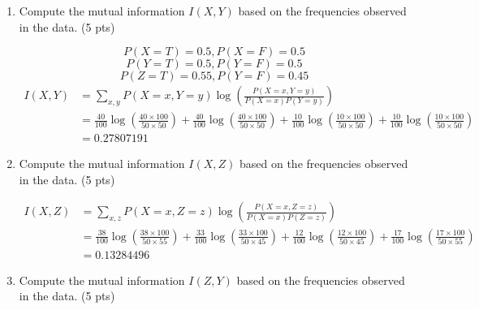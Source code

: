 \documentclass[a4paper]{article}
\theoremstyle{definition}
\newenvironment{soln}{
	\leavevmode\color{blue}\ignorespaces
}{}
\begin{document}
\begin{enumerate}
	\item Compute the mutual information $I(X, Y)$ based on the frequencies observed in the data. (5 pts)
	      \begin{soln}
		      \[
			      P(X=T) = 0.5, P(X=F) = 0.5
		      \]
		      \[
			      P(Y=T) = 0.5, P(Y=F) = 0.5
		      \]
		      \[
			      P(Z=T) = 0.55, P(Y=F) = 0.45
		      \]
		      \begin{align*}
			      I(X, Y) & = \sum_{x, y} P(X=x, Y=y) \log\left(\frac{P(X=x, Y=y)}{P(X=x)P(Y=y)}\right)                                                                                                                                                                                                       \\
			              & = \frac{40}{100} \log\left(\frac{40 \times 100}{50 \times 50}\right) + \frac{40}{100} \log\left(\frac{40 \times 100}{50 \times 50}\right) +\frac{10}{100} \log\left(\frac{10 \times 100}{50 \times 50}\right) +\frac{10}{100} \log\left(\frac{10 \times 100}{50 \times 50}\right) \\
			              & = 0.27807191
		      \end{align*}
	      \end{soln}
	\item Compute the mutual information $I(X, Z)$ based on the frequencies observed in the data. (5 pts)
	      \begin{soln}
		      \begin{align*}
			      I(X, Z) & = \sum_{x, z} P(X=x, Z=z) \log\left(\frac{P(X=x, Z=z)}{P(X=x)P(Z=z)}\right)                                                                                                                                                                                                      \\
			              & = \frac{38}{100} \log\left(\frac{38 \times 100}{50 \times 55}\right) +\frac{33}{100} \log\left(\frac{33 \times 100}{50 \times 45}\right) +\frac{12}{100} \log\left(\frac{12 \times 100}{50 \times 45}\right) +\frac{17}{100} \log\left(\frac{17 \times 100}{50 \times 55}\right) \\
			              & = 0.13284496
		      \end{align*}
	      \end{soln}
	\item Compute the mutual information $I(Z, Y)$ based on the frequencies observed in the data. (5 pts)
	      \begin{soln}

\end{soln}
\end{enumerate}
\end{document}

